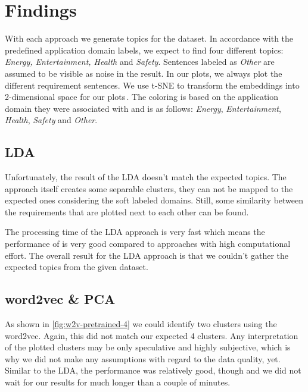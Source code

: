 \section{Findings} %
\label{sec:findings}
With each approach we generate topics for the \crowdre{} dataset. In accordance with the predefined application domain labels, we expect to find four different topics: \textit{Energy, Entertainment, Health} and \textit{Safety}. Sentences labeled as \textit{Other} are assumed to be visible as noise in the result.
In our plots, we always plot the different requirement sentences. We use t-SNE to transform the embeddings into 2-dimensional space for our plots\,\cite{maaten_visualizing_2008}. The coloring is based on the application domain they were associated with and is as follows: \textcolor{clr_energy}{\emph{Energy}}, \textcolor{clr_entertainment}{\emph{Entertainment}}, \textcolor{clr_health}{\emph{Health}}, \textcolor{clr_safety}{\emph{Safety}} and \textcolor{clr_other}{\emph{Other}}.

\subsection{LDA} %
\label{sub:findings_lda}

Unfortunately, the result of the LDA doesn't match the expected topics. The approach itself creates some separable clusters, they can not be mapped to the expected ones considering the soft labeled domains. Still, some similarity between the requirements that are plotted next to each other can be found.

The processing time of the LDA approach is very fast which means the performance of is very good compared to approaches with high computational effort. The overall result for the LDA approach is that we couldn't gather the expected topics from the given dataset. 

\subsection{word2vec \& PCA} %
\label{sub:findings_w2v}
As shown in \autoref{fig:w2v-pretrained-4} we could identify two clusters using the word2vec. Again, this did not match our expected 4 clusters. Any interpretation of the plotted clusters may be only speculative and highly subjective, which is why we did not make any assumptions with regard to the data quality, yet.
Similar to the LDA, the performance was relatively good, though and we did not wait for our results for much longer than a couple of minutes.

